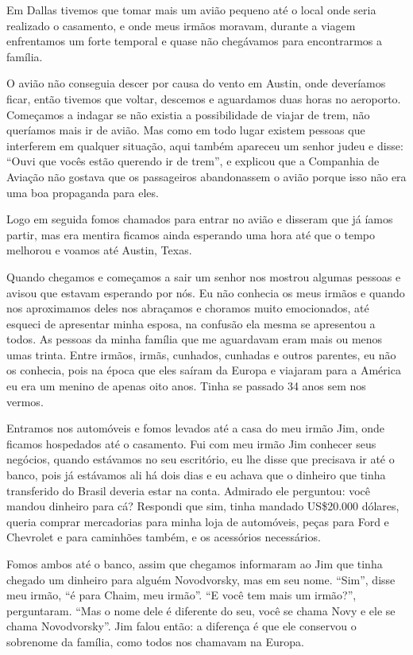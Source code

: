 Em Dallas tivemos que tomar mais um avião pequeno até o local onde seria
realizado o casamento, e onde meus irmãos moravam, durante a viagem
enfrentamos um forte temporal e quase não chegávamos para encontrarmos a
família.

O avião não conseguia descer por causa do vento em Austin, onde
deveríamos ficar, então tivemos que voltar, descemos e aguardamos duas
horas no aeroporto. Começamos a indagar se não existia a possibilidade
de viajar de trem, não queríamos mais ir de avião. Mas como em todo
lugar existem pessoas que interferem em qualquer situação, aqui também
apareceu um senhor judeu e disse: ``Ouvi que vocês estão querendo ir de
trem'', e explicou que a Companhia de Aviação não gostava que os
passageiros abandonassem o avião porque isso não era uma boa propaganda
para eles.

Logo em seguida fomos chamados para entrar no avião e disseram que já
íamos partir, mas era mentira ficamos ainda esperando uma hora até que o
tempo melhorou e voamos até Austin, Texas.

Quando chegamos e começamos a sair um senhor nos mostrou algumas pessoas
e avisou que estavam esperando por nós. Eu não conhecia os meus irmãos e
quando nos aproximamos deles nos abraçamos e choramos muito emocionados,
até esqueci de apresentar minha esposa, na confusão ela mesma se
apresentou a todos. As pessoas da minha família que me aguardavam eram
mais ou menos umas trinta. Entre irmãos, irmãs, cunhados, cunhadas e
outros parentes, eu não os conhecia, pois na época que eles saíram da
Europa e viajaram para a América eu era um menino de apenas oito anos.
Tinha se passado 34 anos sem nos vermos.

Entramos nos automóveis e fomos levados até a casa do meu irmão Jim,
onde ficamos hospedados até o casamento. Fui com meu irmão Jim conhecer
seus negócios, quando estávamos no seu escritório, eu lhe disse que
precisava ir até o banco, pois já estávamos ali há dois dias e eu achava
que o dinheiro que tinha transferido do Brasil deveria estar na conta.
Admirado ele perguntou: você mandou dinheiro para cá? Respondi que sim,
tinha mandado US\$20.000 dólares, queria comprar mercadorias para minha
loja de automóveis, peças para Ford e Chevrolet e para caminhões também,
e os acessórios necessários.

Fomos ambos até o banco, assim que chegamos informaram ao Jim que tinha
chegado um dinheiro para alguém Novodvorsky, mas em seu nome. ``Sim'',
disse meu irmão, ``é para Chaim, meu irmão''. ``E você tem mais um
irmão?'', perguntaram. ``Mas o nome dele é diferente do seu, você se
chama Novy e ele se chama Novodvorsky''. Jim falou então: a diferença é
que ele conservou o sobrenome da família, como todos nos chamavam na
Europa.

